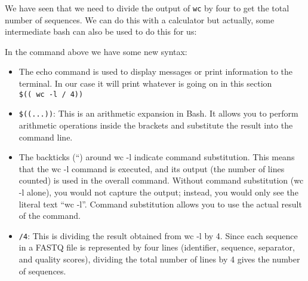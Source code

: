 \documentclass[
  letterpaper,
  DIV=11,
  numbers=noendperiod]{scrreprt}
\newenvironment{Shaded}{}{}
\newcommand{\AttributeTok}[1]{\textcolor[rgb]{0.84,0.23,0.29}{#1}}
\newcommand{\BuiltInTok}[1]{\textcolor[rgb]{0.84,0.23,0.29}{#1}}
\newcommand{\DecValTok}[1]{\textcolor[rgb]{0.00,0.36,0.77}{#1}}
\newcommand{\FunctionTok}[1]{\textcolor[rgb]{0.44,0.26,0.76}{#1}}
\newcommand{\KeywordTok}[1]{\textcolor[rgb]{0.84,0.23,0.29}{#1}}
\newcommand{\NormalTok}[1]{\textcolor[rgb]{0.14,0.16,0.18}{#1}}
\newcommand{\OperatorTok}[1]{\textcolor[rgb]{0.14,0.16,0.18}{#1}}
\newcommand{\VariableTok}[1]{\textcolor[rgb]{0.89,0.38,0.04}{#1}}
\providecommand{\tightlist}{%
  \setlength{\itemsep}{0pt}\setlength{\parskip}{0pt}}\usepackage{longtable,booktabs,array}
\begin{document}
\begin{tcolorbox}[enhanced jigsaw, bottomtitle=1mm, colframe=quarto-callout-tip-color-frame, left=2mm, leftrule=.75mm, coltitle=black, colbacktitle=quarto-callout-tip-color!10!white, toprule=.15mm, rightrule=.15mm, opacityback=0, titlerule=0mm, colback=white, breakable, bottomrule=.15mm, title=\textcolor{quarto-callout-tip-color}{\faLightbulb}\hspace{0.5em}{Avanced Tip: better counting}, arc=.35mm, toptitle=1mm, opacitybacktitle=0.6]

We have seen that we need to divide the output of \texttt{wc} by four to
get the total number of sequences. We can do this with a calculator but
actually, some intermediate bash can also be used to do this for us:

\begin{Shaded}
\end{Shaded}

In the command above we have some new syntax:

\begin{itemize}
\tightlist
\item
  The echo command is used to display messages or print information to
  the terminal. In our case it will print whatever is going on in this
  section
  \texttt{\$((\ \textasciigrave{}wc\ -l\textasciigrave{}\ /\ 4))}
\item
  \texttt{\$((...))}: This is an arithmetic expansion in Bash. It allows
  you to perform arithmetic operations inside the brackets and
  substitute the result into the command line.
\item
  The backticks (``) around wc -l indicate command substitution. This
  means that the wc -l command is executed, and its output (the number
  of lines counted) is used in the overall command. Without command
  substitution (wc -l alone), you would not capture the output; instead,
  you would only see the literal text ``wc -l''. Command substitution
  allows you to use the actual result of the command.
\item
  \texttt{/4}: This is dividing the result obtained from wc -l by 4.
  Since each sequence in a FASTQ file is represented by four lines
  (identifier, sequence, separator, and quality scores), dividing the
  total number of lines by 4 gives the number of sequences.
\end{itemize}

\end{tcolorbox}
\end{document}
